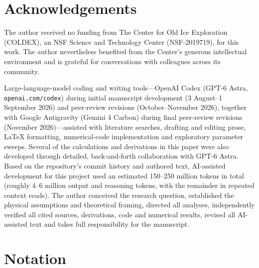 \documentclass[review]{igs}
\begin{document}
\section*{Acknowledgements}
The author received no funding from The Center for Old Ice Exploration (COLDEX), an NSF Science and Technology Center (NSF-2019719), for this work. The author nevertheless benefited from the Center's generous intellectual environment and is grateful for conversations with colleagues across its community.

Large-language-model coding and writing tools---OpenAI Codex (GPT-6 Astra, \texttt{openai.com/codex}) during initial manuscript development (3 August--1 September 2026) and peer-review revisions (October--November 2026), together with Google Antigravity (Gemini 4 Carbon) during final peer-review revisions (November 2026)---assisted with literature searches, drafting and editing prose, LaTeX formatting, numerical-code implementation and exploratory parameter sweeps. Several of the calculations and derivations in this paper were also developed through detailed, back-and-forth collaboration with GPT-6 Astra. Based on the repository's commit history and authored text, AI-assisted development for this project used an estimated 150--250 million tokens in total (roughly 4--6 million output and reasoning tokens, with the remainder in repeated context reads). The author conceived the research question, established the physical assumptions and theoretical framing, directed all analyses, independently verified all cited sources, derivations, code and numerical results, revised all AI-assisted text and takes full responsibility for the manuscript.




\setcounter{secnumdepth}{1}
\appendix
\makeatletter
{}
\makeatother

\section{Notation}
\label{app:notation}
\end{document}

